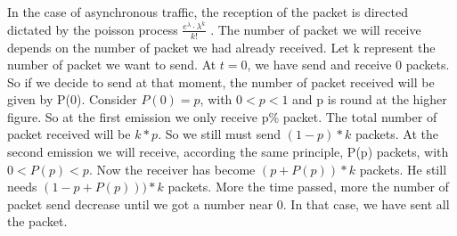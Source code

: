 In the case of asynchronous traffic, the reception of the packet is directed dictated by the poisson process  $ \frac{e^{\lambda} \cdot \lambda^{k}}{k!}$ . The number of packet we will receive depends on the number of packet we had already received. Let k represent the number of packet we want to send. At $ t=0 $, we have send and receive 0 packets. So if we decide to send at that moment, the number of packet received will be given by P(0). Consider $ P(0)=p $, with $ 0 < p < 1 $ and p is round at the higher figure. So at the first emission we only receive p\% packet. The total number of packet received will be $ k*p $. So we still must send $ (1-p)*k $ packets. At the second emission we will receive, according the same principle, P(p) packets, with $ 0 < P(p) < p $. Now the receiver has become $ (p+P(p))*k $ packets. He still needs $ (1-p+P(p)))*k $ packets. More the time passed, more the number of packet send decrease until we got a number near 0. In that case, we have sent all the packet.


